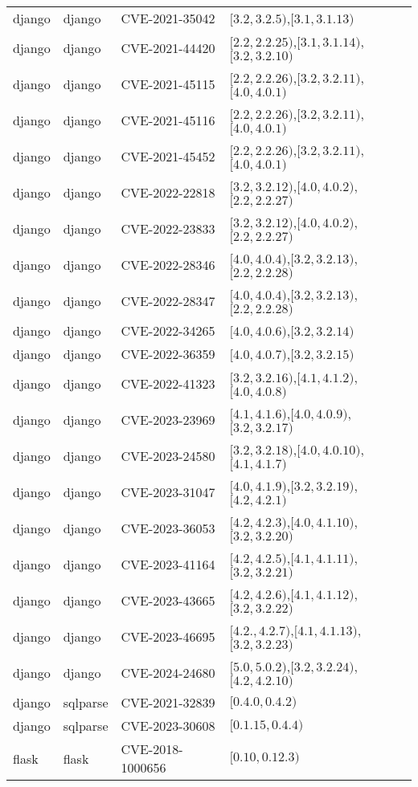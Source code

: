 \begin{tabular}{llll}
django & django & CVE-2021-35042 & $[3.2,3.2.5)$,$[3.1,3.1.13)$ \\
django & django & CVE-2021-44420 & $[2.2,2.2.25)$,$[3.1,3.1.14)$,$[3.2,3.2.10)$ \\
django & django & CVE-2021-45115 & $[2.2,2.2.26)$,$[3.2,3.2.11)$,$[4.0,4.0.1)$ \\
django & django & CVE-2021-45116 & $[2.2,2.2.26)$,$[3.2,3.2.11)$,$[4.0,4.0.1)$ \\
django & django & CVE-2021-45452 & $[2.2,2.2.26)$,$[3.2,3.2.11)$,$[4.0,4.0.1)$ \\
django & django & CVE-2022-22818 & $[3.2,3.2.12)$,$[4.0,4.0.2)$,$[2.2,2.2.27)$ \\
django & django & CVE-2022-23833 & $[3.2,3.2.12)$,$[4.0,4.0.2)$,$[2.2,2.2.27)$ \\
django & django & CVE-2022-28346 & $[4.0,4.0.4)$,$[3.2,3.2.13)$,$[2.2,2.2.28)$ \\
django & django & CVE-2022-28347 & $[4.0,4.0.4)$,$[3.2,3.2.13)$,$[2.2,2.2.28)$ \\
django & django & CVE-2022-34265 & $[4.0,4.0.6)$,$[3.2,3.2.14)$ \\
django & django & CVE-2022-36359 & $[4.0,4.0.7)$,$[3.2,3.2.15)$ \\
django & django & CVE-2022-41323 & $[3.2,3.2.16)$,$[4.1,4.1.2)$,$[4.0,4.0.8)$ \\
django & django & CVE-2023-23969 & $[4.1,4.1.6)$,$[4.0,4.0.9)$,$[3.2,3.2.17)$ \\
django & django & CVE-2023-24580 & $[3.2,3.2.18)$,$[4.0,4.0.10)$,$[4.1,4.1.7)$ \\
django & django & CVE-2023-31047 & $[4.0,4.1.9)$,$[3.2,3.2.19)$,$[4.2,4.2.1)$ \\
django & django & CVE-2023-36053 & $[4.2,4.2.3)$,$[4.0,4.1.10)$,$[3.2,3.2.20)$ \\
django & django & CVE-2023-41164 & $[4.2,4.2.5)$,$[4.1,4.1.11)$,$[3.2,3.2.21)$ \\
django & django & CVE-2023-43665 & $[4.2,4.2.6)$,$[4.1,4.1.12)$,$[3.2,3.2.22)$ \\
django & django & CVE-2023-46695 & $[4.2.,4.2.7)$,$[4.1,4.1.13)$,$[3.2,3.2.23)$ \\
django & django & CVE-2024-24680 & $[5.0,5.0.2)$,$[3.2,3.2.24)$,$[4.2,4.2.10)$ \\
django & sqlparse & CVE-2021-32839 & $[0.4.0,0.4.2)$ \\
django & sqlparse & CVE-2023-30608 & $[0.1.15,0.4.4)$ \\
flask & flask & CVE-2018-1000656 & $[0.10,0.12.3)$ \\

\end{tabular}
